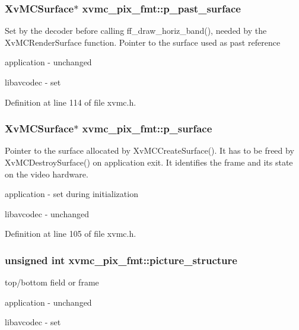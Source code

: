 \subsubsection[{\texorpdfstring{p\+\_\+past\+\_\+surface}{p_past_surface}}]{\setlength{\rightskip}{0pt plus 5cm}Xv\+M\+C\+Surface$\ast$ xvmc\+\_\+pix\+\_\+fmt\+::p\+\_\+past\+\_\+surface}\hypertarget{structxvmc__pix__fmt_a7cf41a3215c965c406a066e8cb6cb58b}{}\label{structxvmc__pix__fmt_a7cf41a3215c965c406a066e8cb6cb58b}
Set by the decoder before calling ff\+\_\+draw\+\_\+horiz\+\_\+band(), needed by the Xv\+M\+C\+Render\+Surface function. Pointer to the surface used as past reference
\begin{DoxyItemize}
\item application -\/ unchanged
\item libavcodec -\/ set 
\end{DoxyItemize}

Definition at line 114 of file xvmc.\+h.

\subsubsection[{\texorpdfstring{p\+\_\+surface}{p_surface}}]{\setlength{\rightskip}{0pt plus 5cm}Xv\+M\+C\+Surface$\ast$ xvmc\+\_\+pix\+\_\+fmt\+::p\+\_\+surface}\hypertarget{structxvmc__pix__fmt_a027005d198ee1a18b1c7f466df8b03c5}{}\label{structxvmc__pix__fmt_a027005d198ee1a18b1c7f466df8b03c5}
Pointer to the surface allocated by Xv\+M\+C\+Create\+Surface(). It has to be freed by Xv\+M\+C\+Destroy\+Surface() on application exit. It identifies the frame and its state on the video hardware.
\begin{DoxyItemize}
\item application -\/ set during initialization
\item libavcodec -\/ unchanged 
\end{DoxyItemize}

Definition at line 105 of file xvmc.\+h.

\subsubsection[{\texorpdfstring{picture\+\_\+structure}{picture_structure}}]{\setlength{\rightskip}{0pt plus 5cm}unsigned {\bf int} xvmc\+\_\+pix\+\_\+fmt\+::picture\+\_\+structure}\hypertarget{structxvmc__pix__fmt_a6d835e18579427c7fbe5b7987d01b764}{}\label{structxvmc__pix__fmt_a6d835e18579427c7fbe5b7987d01b764}
top/bottom field or frame
\begin{DoxyItemize}
\item application -\/ unchanged
\item libavcodec -\/ set 
\end{DoxyItemize}

